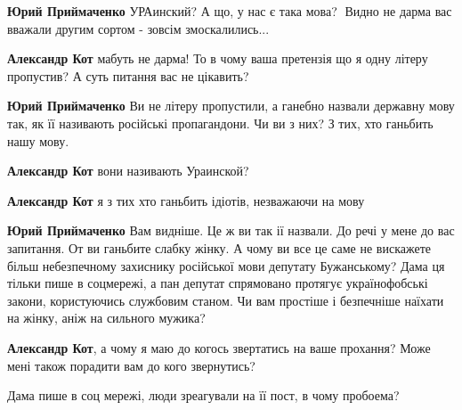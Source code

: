 \begin{itemize}
\begin{itemize}
\textbf{Юрий Приймаченко} УРАинский? А що, у нас є така мова?🤣 Видно не дарма вас вважали другим сортом - зовсім змоскалились...


\textbf{Александр Кот} мабуть не дарма! То в чому ваша претензія що я одну літеру пропустив? А суть питання вас не цікавить?


\textbf{Юрий Приймаченко} Ви не літеру пропустили, а ганебно назвали державну мову так, як її називають російські пропагандони. Чи ви з них? З тих, хто ганьбить нашу мову.


\textbf{Александр Кот} вони називають Ураинской?


\textbf{Александр Кот} я з тих хто ганьбить ідіотів, незважаючи на мову

\textbf{Юрий Приймаченко} Вам видніше. Це ж ви так ії назвали. До речі у мене до вас запитання. От ви ганьбите слабку жінку. А чому ви все це саме не вискажете більш небезпечному захиснику російської мови депутату Бужанському? Дама ця тільки пише в соцмережі, а пан депутат спрямовано протягує українофобські закони, користуючись службовим станом. Чи вам простіше і безпечніше наїхати на жінку, аніж на сильного мужика?


\textbf{Александр Кот}, а чому я маю до когось звертатись на ваше прохання? Може мені також порадити вам до кого звернутись?


Дама пише в соц мережі, люди зреагували на її пост, в чому пробоема?



\end{itemize}
\end{itemize}
